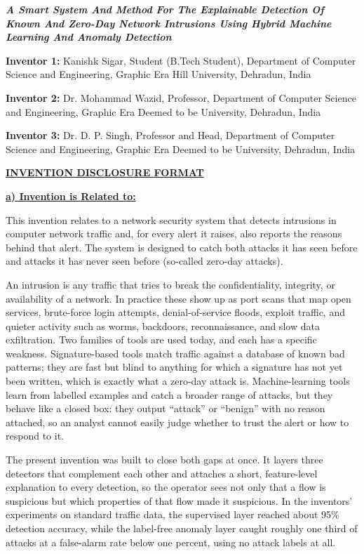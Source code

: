 \documentclass[12pt]{article}
\newcommand{\shead}[1]{\vspace{2pt}\textbf{\underline{#1}}\par}
\begin{document}
\begin{center}
\textbf{\itshape A Smart System And Method For The Explainable Detection Of Known
And Zero-Day Network Intrusions Using Hybrid Machine Learning And Anomaly Detection}
\end{center}

\vspace{8pt}

\textbf{Inventor 1:} Kanishk Sigar, Student (B.Tech Student), Department of Computer
Science and Engineering, Graphic Era Hill University, Dehradun, India

\textbf{Inventor 2:} Dr. Mohammad Wazid, Professor, Department of Computer Science and
Engineering, Graphic Era Deemed to be University, Dehradun, India

\textbf{Inventor 3:} Dr. D. P. Singh, Professor and Head, Department of Computer Science
and Engineering, Graphic Era Deemed to be University, Dehradun, India

\vspace{10pt}
\begin{center}\textbf{\underline{INVENTION DISCLOSURE FORMAT}}\end{center}

\clearpage
\shead{a) Invention is Related to:}
This invention relates to a network security system that detects intrusions in computer
network traffic and, for every alert it raises, also reports the reasons behind that
alert. The system is designed to catch both attacks it has seen before and attacks it
has never seen before (so-called zero-day attacks).

An intrusion is any traffic that tries to break the confidentiality, integrity, or
availability of a network. In practice these show up as port scans that map open
services, brute-force login attempts, denial-of-service floods, exploit traffic, and
quieter activity such as worms, backdoors, reconnaissance, and slow data exfiltration.
Two families of tools are used today, and each has a specific weakness. Signature-based
tools match traffic against a database of known bad patterns; they are fast but blind to
anything for which a signature has not yet been written, which is exactly what a zero-day
attack is. Machine-learning tools learn from labelled examples and catch a broader
range of attacks, but they behave like a closed box: they output ``attack'' or
``benign'' with no reason attached, so an analyst cannot easily judge whether to trust
the alert or how to respond to it.

The present invention was built to close both gaps at once. It layers three detectors
that complement each other and attaches a short, feature-level explanation to every
detection, so the operator sees not only that a flow is suspicious but which properties
of that flow made it suspicious. In the inventors' experiments on standard traffic data,
the supervised layer reached about 95\% detection accuracy, while the label-free
anomaly layer caught roughly one third of attacks at a false-alarm rate below one
percent, using no attack labels at all.
\end{document}
